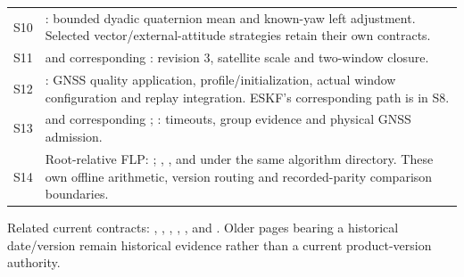 \begin{small}
\begin{longtable}{@{}L{8mm}L{134mm}@{}}
S10 & : bounded dyadic quaternion mean and known-yaw left adjustment. Selected vector/external-attitude strategies retain their own contracts. \\
S11 &  and corresponding : revision 3, satellite scale and two-window closure. \\
S12 & : GNSS quality application, profile/initialization, actual window configuration and replay integration. ESKF's corresponding path is in S8. \\
S13 &  and corresponding ; : timeouts, group evidence and physical GNSS admission. \\
S14 & Root-relative FLP: ; , ,  and  under the same algorithm directory. These own offline arithmetic, version routing and recorded-parity comparison boundaries. \\
\bottomrule
\end{longtable}
\end{small}

Related current contracts: , , , , ,  and . Older pages bearing a historical date/version remain historical evidence rather than a current product-version authority.
